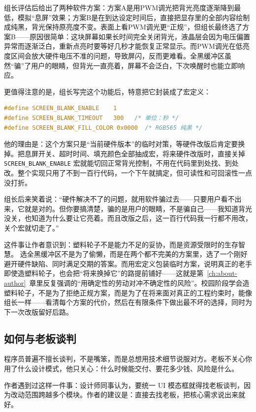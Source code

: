 组长评估后给出了两种软件方案：方案A是用PWM调光把背光亮度逐渐降到最低，模拟“息屏”效果；方案B是在到达设定时间后，直接把显存里的全部内容绘制成纯黑，背光保持原亮度不变。表面上看PWM调光更“正规”，但组长最终选了方案B——原因很简单：这块屏幕如果长时间完全关闭背光，液晶层会因为电压偏置异常而逐渐泛白，重新点亮时要等好几秒才能恢复正常显示。而PWM调光在低亮度区间会放大硬件电压不准的问题，导致屏闪，反而更难看。全黑缓冲区虽然“骗”了用户的眼睛，但背光一直亮着，屏幕不会泛白，下次唤醒时也能立即响应。

更值得注意的是，组长写完这个功能后，特意把它封装成了宏定义：

\begin{lstlisting}[language=C]
#define SCREEN_BLANK_ENABLE    1
#define SCREEN_BLANK_TIMEOUT   300   /* 单位：秒 */
#define SCREEN_BLANK_FILL_COLOR 0x0000  /* RGB565 纯黑 */
\end{lstlisting}
他的理由是：这个方案只是“当前硬件版本”的临时对策，等硬件改版后肯定要换掉。把息屏开关、超时时间、填充颜色全部抽成宏，将来硬件改版时，直接关掉 \texttt{SCREEN\_BLANK\_ENABLE} 宏就能切回正常背光控制，不用在代码里到处找、到处改。整个实现只用了不到一百行代码，一个下午就搞定，但可读性和可回滚性一点没打折。

组长后来笑着说：“硬件解决不了的问题，就用软件骗过去——只要用户看不出来，它就是对的。但你要搞清楚，骗的是用户的眼睛，不是骗自己——我知道背光没关，也知道为什么要让它亮着。而且改版之后，这一百行代码我一行都不用改，关个宏就切走了。”

这件事让作者意识到：塑料轮子不是能力不足的妥协，而是资源受限时的生存智慧。 选全黑缓冲区不是为了偷懒，而是在两个都不完美的方案里，选了一个刚好避开硬件缺陷、同时满足交期的答案。而用宏定义包装临时方案，说明真正的老手即使造塑料轮子，也会把“将来换掉它”的路提前铺好——这就是第~\ref{ch:about-author}~章里反复强调的“用确定性的劳动对冲不确定性的风险”。校园阶段学会造塑料轮子，不是为了拒绝正规方案，而是为了在将来面对真正的工程约束时，能像组长一样——看清每个方案的代价，然后在有限条件下做出最不坏的选择，同时为下一次改版留好后路。

\subsection{如何与老板谈判}

程序员普遍不擅长谈判，不是嘴笨，而是总想用技术细节说服对方。老板不关心你用了什么设计模式，他只关心：什么时候能交付、要花多少钱、风险是什么。

作者遇到过这样一件事：设计师同事认为，要统一 UI 模态框就得找老板谈判，因为改动范围跨越多个模块。作者的建议是：直接去找老板，把核心需求说出来就好。

